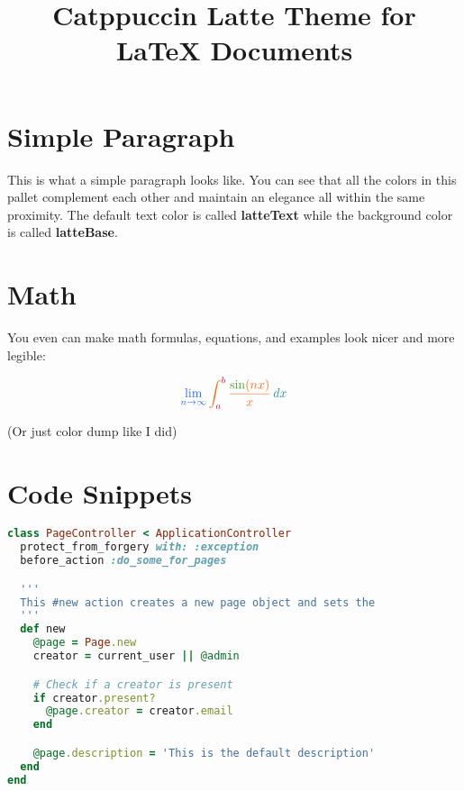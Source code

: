 \documentclass[12pt]{article}
\title{ \Huge \textbf{\textcolor{latteMaroon}{Catppuccin Latte Theme for} \textcolor{latteMauve}{\LaTeX{} Documents}} \vspace{-3em}}
\date{}
\begin{document}
\maketitle

\section{\textcolor{latteBlue}{Simple Paragraph}}
\textcolor{lattePeach}{This is what a simple paragraph looks like.} You can see that all the colors in this pallet complement each other and maintain an elegance all within the same proximity. The default text color is called \textbf{\textcolor{latteGreen}{latteText}} while the background color is called \textbf{\textcolor{latteGreen}{latteBase}}.

\section{\textcolor{latteBlue}{Math}}

You even can make math formulas, equations, and examples look nicer and more legible:


\[\large{
    \textcolor{latteBlue}{\lim_{{n \to \infty}} \textcolor{lattePeach}{\int_{\textcolor{latteRed}{a}}^{\textcolor{latteRed}{b}} \frac{\textcolor{latteGreen}{\sin}(\textcolor{lattePeach}{nx})}{\textcolor{lattePeach}{x}} \, \textcolor{latteTeal}{dx}}}
}\]

\tiny{(Or just color dump like I did)}

\section{\textcolor{latteBlue}{Code Snippets}}

\begin{lstlisting}[language=Ruby,style=ruby_on_rails, caption={A ruby on rails code sample}]
class PageController < ApplicationController
  protect_from_forgery with: :exception
  before_action :do_some_for_pages

  '''
  This #new action creates a new page object and sets the
  '''
  def new
    @page = Page.new
    creator = current_user || @admin

    # Check if a creator is present
    if creator.present?
      @page.creator = creator.email
    end

    @page.description = 'This is the default description'
  end
end
\end{lstlisting}
\end{document}
